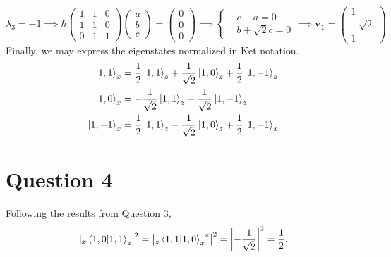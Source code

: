 \documentclass[12pt]{article}
\theoremstyle{definition}
\theoremstyle{definition}
\theoremstyle{definition}
\theoremstyle{definition}
\theoremstyle{definition}
\theoremstyle{example}
\theoremstyle{note}
\theoremstyle{remark}
\theoremstyle{example}
\begin{document}
			\begin{equation*}
			\lambda_{3} =-1 \implies \hbar\begin{pmatrix}
			1 & 1 & 0 \\
			1 & 1 & 0 \\
			0 & 1 & 1
			\end{pmatrix}\begin{pmatrix}
			a \\ b \\ c
			\end{pmatrix} = \begin{pmatrix}
			0 \\ 0 \\0 
			\end{pmatrix} \implies \begin{cases}
			&c-a = 0 \\
			&b+ \sqrt{2}c = 0
			\end{cases} \implies \boldsymbol{v_{1}} = \begin{pmatrix}
			1 \\ -\sqrt{2} \\ 1
			\end{pmatrix}
			\end{equation*} 
			Finally, we may express the eigenstates normalized in Ket notation. 
			\begin{align*}
				\ket{1,1}_{x} & = \frac12 \ket{1, 1}_{z} + \frac{1}{\sqrt{2}} \ket{1,0}_{z} + \frac12 \ket{1,-1}_{z} \\
				\ket{1,0}_{x} &= -\frac{1}{\sqrt{2}} \ket{1,1}_{z} + \frac{1}{\sqrt{2}} \ket{1,-1}_{z} \\
				\ket{1,-1}_{x} &= \frac12 \ket{1,1}_{z} -\frac{1}{\sqrt{2}} \ket{1,0}_{z} + \frac12 \ket{1,-1}_{x}
			\end{align*}
		\section*{Question 4}
			Following the results from Question $3$, 
			$$ \abs{_{x}\braket{1,0}{1,1}_{z}}^{2} = \abs{{_{z}\braket{1,1}{1,0}_{x}}^{\ast}}^{2} = \abs{-\frac{1}{\sqrt{2}}}^{2} = \frac12.$$
\end{document}
